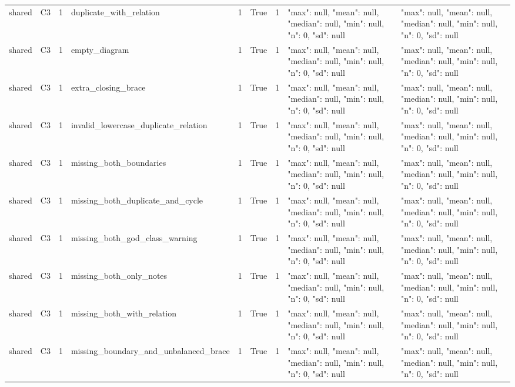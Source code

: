 \begin{tabular}{lllllllll}
shared & C3 & 1 & duplicate\_with\_relation & 1 & True & 1 & {"max": null, "mean": null, "median": null, "min": null, "n": 0, "sd": null} & {"max": null, "mean": null, "median": null, "min": null, "n": 0, "sd": null} \\
shared & C3 & 1 & empty\_diagram & 1 & True & 1 & {"max": null, "mean": null, "median": null, "min": null, "n": 0, "sd": null} & {"max": null, "mean": null, "median": null, "min": null, "n": 0, "sd": null} \\
shared & C3 & 1 & extra\_closing\_brace & 1 & True & 1 & {"max": null, "mean": null, "median": null, "min": null, "n": 0, "sd": null} & {"max": null, "mean": null, "median": null, "min": null, "n": 0, "sd": null} \\
shared & C3 & 1 & invalid\_lowercase\_duplicate\_relation & 1 & True & 1 & {"max": null, "mean": null, "median": null, "min": null, "n": 0, "sd": null} & {"max": null, "mean": null, "median": null, "min": null, "n": 0, "sd": null} \\
shared & C3 & 1 & missing\_both\_boundaries & 1 & True & 1 & {"max": null, "mean": null, "median": null, "min": null, "n": 0, "sd": null} & {"max": null, "mean": null, "median": null, "min": null, "n": 0, "sd": null} \\
shared & C3 & 1 & missing\_both\_duplicate\_and\_cycle & 1 & True & 1 & {"max": null, "mean": null, "median": null, "min": null, "n": 0, "sd": null} & {"max": null, "mean": null, "median": null, "min": null, "n": 0, "sd": null} \\
shared & C3 & 1 & missing\_both\_god\_class\_warning & 1 & True & 1 & {"max": null, "mean": null, "median": null, "min": null, "n": 0, "sd": null} & {"max": null, "mean": null, "median": null, "min": null, "n": 0, "sd": null} \\
shared & C3 & 1 & missing\_both\_only\_notes & 1 & True & 1 & {"max": null, "mean": null, "median": null, "min": null, "n": 0, "sd": null} & {"max": null, "mean": null, "median": null, "min": null, "n": 0, "sd": null} \\
shared & C3 & 1 & missing\_both\_with\_relation & 1 & True & 1 & {"max": null, "mean": null, "median": null, "min": null, "n": 0, "sd": null} & {"max": null, "mean": null, "median": null, "min": null, "n": 0, "sd": null} \\
shared & C3 & 1 & missing\_boundary\_and\_unbalanced\_brace & 1 & True & 1 & {"max": null, "mean": null, "median": null, "min": null, "n": 0, "sd": null} & {"max": null, "mean": null, "median": null, "min": null, "n": 0, "sd": null} \\

\end{tabular}
